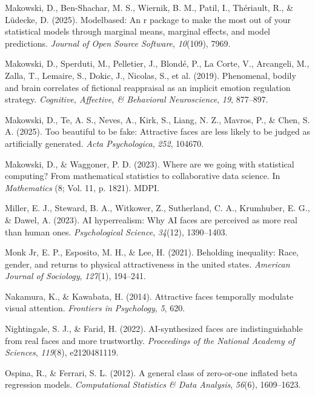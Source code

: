 \documentclass[
  jou,
  floatsintext,
  longtable,
  nolmodern,
  notxfonts,
  notimes,
  colorlinks=true,linkcolor=blue,citecolor=blue,urlcolor=blue]{apa7}
\newlength{\cslhangindent}
\newenvironment{CSLReferences}[2] %
 {\begin{list}{}{%
  \setlength{\itemindent}{0pt}
  \setlength{\leftmargin}{0pt}
  \setlength{\parsep}{0pt}
  \ifodd #1
   \setlength{\leftmargin}{\cslhangindent}
   \setlength{\itemindent}{-1\cslhangindent}
  \fi
  \setlength{\itemsep}{#2\baselineskip}}}
 {\end{list}}
\begin{document}
\begin{CSLReferences}{1}{0}
Makowski, D., Ben-Shachar, M. S., Wiernik, B. M., Patil, I., Thériault,
R., \& Lüdecke, D. (2025). Modelbased: An r package to make the most out
of your statistical models through marginal means, marginal effects, and
model predictions. \emph{Journal of Open Source Software},
\emph{10}(109), 7969.

Makowski, D., Sperduti, M., Pelletier, J., Blondé, P., La Corte, V.,
Arcangeli, M., Zalla, T., Lemaire, S., Dokic, J., Nicolas, S., et al.
(2019). Phenomenal, bodily and brain correlates of fictional reappraisal
as an implicit emotion regulation strategy. \emph{Cognitive, Affective,
\& Behavioral Neuroscience}, \emph{19}, 877--897.

Makowski, D., Te, A. S., Neves, A., Kirk, S., Liang, N. Z., Mavros, P.,
\& Chen, S. A. (2025). Too beautiful to be fake: Attractive faces are
less likely to be judged as artificially generated. \emph{Acta
Psychologica}, \emph{252}, 104670.

Makowski, D., \& Waggoner, P. D. (2023). Where are we going with
statistical computing? From mathematical statistics to collaborative
data science. In \emph{Mathematics} (8; Vol. 11, p. 1821). MDPI.

Miller, E. J., Steward, B. A., Witkower, Z., Sutherland, C. A.,
Krumhuber, E. G., \& Dawel, A. (2023). AI hyperrealism: Why AI faces are
perceived as more real than human ones. \emph{Psychological Science},
\emph{34}(12), 1390--1403.

Monk Jr, E. P., Esposito, M. H., \& Lee, H. (2021). Beholding
inequality: Race, gender, and returns to physical attractiveness in the
united states. \emph{American Journal of Sociology}, \emph{127}(1),
194--241.

Nakamura, K., \& Kawabata, H. (2014). Attractive faces temporally
modulate visual attention. \emph{Frontiers in Psychology}, \emph{5},
620.

Nightingale, S. J., \& Farid, H. (2022). AI-synthesized faces are
indistinguishable from real faces and more trustworthy.
\emph{Proceedings of the National Academy of Sciences}, \emph{119}(8),
e2120481119.

Ospina, R., \& Ferrari, S. L. (2012). A general class of zero-or-one
inflated beta regression models. \emph{Computational Statistics \& Data
Analysis}, \emph{56}(6), 1609--1623.


\end{CSLReferences}
\end{document}
